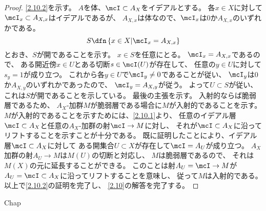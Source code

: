 \documentclass[uplatex,dvipdfmx]{jsarticle}
\begin{document}
\begin{proof}
  \ref{2.10.2}を示す。
  \(A\)を体、\(\mcI\subset A_X\)をイデアルとする。
  各\(x\in X\)に対して
  \(\mcI_x\subset A_{X,x}\)はイデアルであるが、
  \(A_{X,x}\)は体なので、\(\mcI_x\)は\(0\)か\(A_{X,x}\)のいずれかである。
  \[S\dfn \left\{x\in X\middle| \mcI_x=A_{X,x}\right\}\]
  とおき、\(S\)が開であることを示す。
  \(x\in S\)を任意にとる。
  \(\mcI_x=A_{X,x}\)であるので、
  ある開近傍\(x\in U\)とある切断\(s\in \mcI(U)\)が存在して、
  任意の\(y\in U\)に対して\(s_y = 1\)が成り立つ。
  これから各\(y\in U\)で\(\mcI_y\neq 0\)であることが従い、
  \(\mcI_y\)は\(0\)か\(A_{X,y}\)のいずれかであったので、
  \(\mcI_y = A_{X,y}\)が従う。
  よって\(U\subset S\)が従い、これは\(S\)が開であることを示している。
  最後の主張を示す。
  入射的ならば脆弱層であるため、
  \(A_X\)-加群\(M\)が脆弱層である場合に\(M\)が入射的であることを示す。
  \(M\)が入射的であることを示すためには、\ref{2.10.1}より、
  任意のイデアル層\(\mcI\subset A_X\)と任意の\(A_X\)-加群の射\(\mcI\to M\)に対し、
  それが\(\mcI\subset A_X\)に沿ってリフトすることを示すことが十分である。
  既に証明したことにより、イデアル層\(\mcI\subset A_X\)に対して
  ある開集合\(U\subset X\)が存在して\(\mcI = A_U\)が成り立つ。
  \(A_X\)加群の射\(A_U\to M\)は\(M(U)\)の切断と対応し、
  \(M\)は脆弱層であるので、
  それは\(M(X)\)の元に延長することができる。
  このことは射\(A_U=\mcI\to M\)が\(A_U=\mcI\subset A_X\)に沿ってリフトすることを意味し、
  従って\(M\)は入射的である。
  以上で\ref{2.10.2}の証明を完了し、
  \autoref{2.10}の解答を完了する。
\end{proof}




\ifcsname Chap\endcsname\else
\printbibliography
\end{document}

